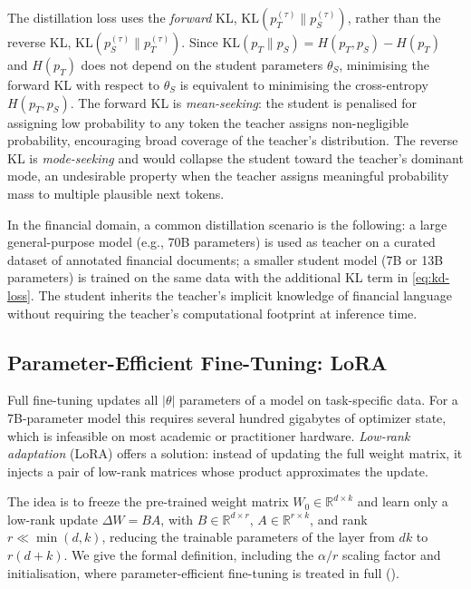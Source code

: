 \begin{deepdive}
\begin{remark}
\label{rem:kd-kl-direction}
The distillation loss uses the \emph{forward} KL, $\mathrm{KL}(p_T^{(\tau)} \| p_S^{(\tau)})$,
rather than the reverse KL, $\mathrm{KL}(p_S^{(\tau)} \| p_T^{(\tau)})$.  Since
$\mathrm{KL}(p_T \| p_S) = H(p_T, p_S) - H(p_T)$ and $H(p_T)$ does not depend
on the student parameters $\theta_S$, minimising the forward KL with respect to
$\theta_S$ is equivalent to minimising the cross-entropy $H(p_T, p_S)$.  The
forward KL is \emph{mean-seeking}: the student is penalised for assigning low
probability to any token the teacher assigns non-negligible probability, encouraging
broad coverage of the teacher's distribution.  The reverse KL is \emph{mode-seeking}
and would collapse the student toward the teacher's dominant mode, an undesirable
property when the teacher assigns meaningful probability mass to multiple plausible
next tokens.
\end{remark}

In the financial domain, a common distillation scenario is the following: a large
general-purpose model (e.g., 70B parameters) is used as teacher on a curated
dataset of annotated financial documents; a smaller student model (7B or 13B
parameters) is trained on the same data with the additional KL term in
\eqref{eq:kd-loss}.  The student inherits the teacher's implicit knowledge of
financial language without requiring the teacher's computational footprint at
inference time.

\subsection{Parameter-Efficient Fine-Tuning: LoRA}
\label{sec:distillation-lora}

Full fine-tuning updates all $|\theta|$ parameters of a model on task-specific data.
For a 7B-parameter model this requires several hundred gigabytes of optimizer state,
which is infeasible on most academic or practitioner hardware.
\emph{Low-rank adaptation} (LoRA) \citep{hu2022lora} offers a solution:
instead of updating the full weight matrix, it injects a pair of low-rank matrices
whose product approximates the update.

The idea is to freeze the pre-trained weight matrix $W_0 \in \mathbb{R}^{d \times k}$
and learn only a low-rank update $\Delta W = BA$, with $B \in \mathbb{R}^{d \times r}$,
$A \in \mathbb{R}^{r \times k}$, and rank $r \ll \min(d, k)$, reducing the trainable
parameters of the layer from $dk$ to $r(d + k)$. We give the formal definition,
including the $\alpha/r$ scaling factor and initialisation, where parameter-efficient
fine-tuning is treated in full ().


\end{deepdive}
